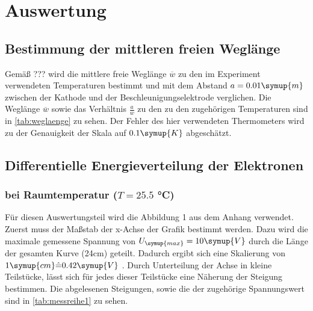 \section{Auswertung}
\label{sec:Auswertung}
    \subsection{Bestimmung der mittleren freien Weglänge}
    Gemäß ??? wird die mittlere freie Weglänge $\overline{w}$ zu den im Experiment verwendeten Temperaturen bestimmt und mit dem Abstand $a = 0.01 \symup{m}$
    zwischen der Kathode und der Beschleunigungselektrode verglichen. Die Weglänge $\overline{w}$ sowie das Verhältnis $\frac{a}{\overline{w}}$
    zu den zu den zugehörigen Temperaturen sind in \autoref{tab:weglaenge} zu sehen. Der Fehler des hier verwendeten Thermometers wird zu 
    der Genauigkeit der Skala auf $0.1 \symup{K}$ abgeschätzt.
    

    \subsection{Differentielle Energieverteilung der Elektronen}
        \subsubsection{bei Raumtemperatur ($T = 25.5 $ °C)}
        Für diesen Auswertungsteil wird die Abbildung 1 aus dem Anhang verwendet. Zuerst muss der Maßstab der x-Achse der Grafik bestimmt werden.
        Dazu wird die maximale gemessene Spannung von $U_{\symup{max}} = 10 \symup{V}$ durch die Länge der gesamten Kurve (24cm) geteilt.
        Dadurch ergibt sich eine Skalierung von $1 \symup{cm} \hat{=} 0.42 \symup{V}$ . Durch Unterteilung der Achse 
        in kleine Teilstücke, lässt sich für jedes dieser Teilstücke eine Näherung der Steigung bestimmen. Die abgelesenen Steigungen, sowie
        die der zugehörige Spannungswert sind in \autoref{tab:messreihe1} zu sehen.
        